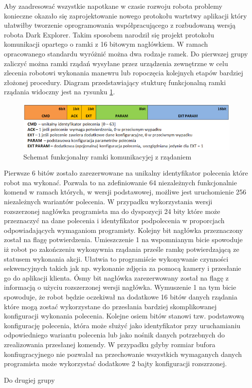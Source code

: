 Aby zaadresować wszystkie napotkane w czasie rozwoju robota problemy konieczne
okazało się zaprojektowanie nowego protokołu wartstwy aplikacji który ułatwiłby
tworzenie oprogramowania współpracującego z rozbudowaną wersją robota Dark
Explorer. Takim sposobem narodził się projekt protokołu komunikacji opartego o
ramki z 16 bitowym nagłówkiem. W ramach opracowanego standardu wyróżnić można
dwa rodzaje ramek. Do pierwszej grupy zaliczyć można ramki rządań wysyłane przez
urządzenia zewnętrzne w celu zlecenia robotowi wykonania manewru lub ropoczęcia
kolejnych etapów bardziej złożonej procedury. Diagram przedstawiający stukturę
funkcjonalną ramki rządania widoczny jest na rysunku \ref{fig:RfcommReqFrame}.

\begin{figure}[h!] 
 \centering
 \includegraphics[width=\textwidth]{../images/ch05/req_schema2.png}
 \caption{Schemat funkcjonalny ramki komunikacyjej z rządaniem}
 \label{fig:RfcommReqFrame}
\end{figure}

Pierwsze 6 bitów zostało zarezerwowane na unikalny identyfikator polecenia które
robot ma wykonać. Pozwala to na zdefiniowanie 64 niezależnych funkcjonalnie
komend w ramach których, w wersji podstawowej, możliwe jest uruchomienie 256
niezależnych wariantów polecenia. W przypadku wykorzystania wersji rozszerzonej
nagłówka programista ma do dyspozycji 24 bity które może przeznaczyć na dane
polecenia i identyfikator podpolecenia w proporcjach odpowiadających wymaganiom
programisty. Kolejny bit nagłówka przeznaczony został na flagę potwierdzenia.
Umieszczenie 1 na wspomnianym bicie spowoduje iż robot po zakończeniu wykonywnia
rządania prześle ramkę potwierdzającą ze statusem wykonania akcji. Ułatwia to
programiście wykonywanie czynności sekwencyjnych takich jak np. wykonanie
zdjęcia za pomocą kamery i przesłanie go do aplikacji klienta. Ósmy bit nagłówka
zarezerwowany został na flagę z informacją o użyciu rozszerzonej wersji
nagłówka. Wymuszenie 1 na tym bicie spowoduje, że robot będzie oczekiwał na
dodatkowe 16 bitów danych rządania które mogą zostać wykorzystane do przesłania
bardziej skomplikowanej konfiguracji wykonania polecenia. Kolejne osiem bitów
stanowi tzw. podstawową konfigurację polecenia, która może służyć jako
identyfikator przy uruchamianiu odpowiedniego wariantu polecenia lub jako nośnik
danych potrzebnych do zrealizowania przesłanej komendy. W przypadku gdyby
rozmiar bufora konfiugracyjnego nie pozwalał na przechowanie wszystkich
wymaganych danych programista może wykorzystać dodatkowe 2 bajty konfiguracji
rozszrzonej.

Do drugiej grupy 


